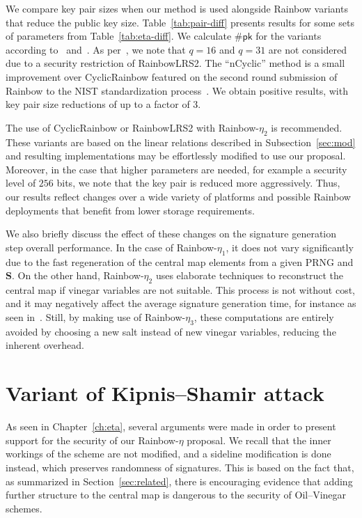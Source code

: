 \documentclass[12pt, a4paper, oneside]{memoir}
\theoremstyle{definition}
\begin{document}
We compare key pair sizes when our method is used alongside Rainbow variants that reduce the public key size. Table~\ref{tab:pair-diff} presents results for some sets of parameters from Table~\ref{tab:eta-diff}. We calculate $\#\mathsf{pk}$ for the variants according to~\cite[Eqs.~9.2,~9.4]{Petzoldt:201307} and~\cite{Petzoldt:202004}. As per~\cite[Remark~9.1]{Petzoldt:201307}, we note that $q = 16$ and $q = 31$ are not considered due to a security restriction of RainbowLRS2. The ``nCyclic'' method is a small improvement over CyclicRainbow featured on the second round submission of Rainbow to the NIST standardization process~\cite{Ding:201901}. We obtain positive results, with key pair size reductions of up to a factor of 3.

The use of CyclicRainbow or RainbowLRS2 with Rainbow-$\eta_{2}$ is recommended. These variants are based on the linear relations described in Subsection~\ref{sec:mod} and resulting implementations may be effortlessly modified to use our proposal. Moreover, in the case that higher parameters are needed, for example a security level of $256$ bits, we note that the key pair is reduced more aggressively. Thus, our results reflect changes over a wide variety of platforms and possible Rainbow deployments that benefit from lower storage requirements.

We also briefly discuss the effect of these changes on the signature generation step overall performance. In the case of Rainbow-$\eta_{1}$, it does not vary significantly due to the fast regeneration of the central map elements from a given PRNG and $\mathbf{S}$. On the other hand, Rainbow-$\eta_{2}$ uses elaborate techniques to reconstruct the central map if vinegar variables are not suitable. This process is not without cost, and it may negatively affect the average signature generation time, for instance as seen in~\cite{Petzoldt:202004}. Still, by making use of Rainbow-$\eta_{3}$, these computations are entirely avoided by choosing a new salt instead of new vinegar variables, reducing the inherent overhead.

\chapter{Variant of Kipnis--Shamir attack}\label{ch:attack}

As seen in Chapter~\ref{ch:eta}, several arguments were made in order to present support for the security of our Rainbow-$\eta$ proposal. We recall that the inner workings of the scheme are not modified, and a sideline modification is done instead, which preserves randomness of signatures. This is based on the fact that, as summarized in Section~\ref{sec:related}, there is encouraging evidence that adding further structure to the central map is dangerous to the security of Oil--Vinegar schemes. 
\end{document}
